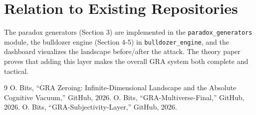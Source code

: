 \documentclass[12pt]{article}
\begin{document}
\section{Relation to Existing Repositories}
The paradox generators (Section 3) are implemented in the \texttt{paradox\_generators} module, the bulldozer engine (Section 4-5) in \texttt{bulldozer\_engine}, and the dashboard visualizes the landscape before/after the attack. The theory paper proves that adding this layer makes the overall GRA system both complete and tactical.

\begin{thebibliography}{9}
 O. Bits, ``GRA Zeroing: Infinite-Dimensional Landscape and the Absolute Cognitive Vacuum,'' GitHub, 2026.
 O. Bits, ``GRA-Multiverse-Final,'' GitHub, 2026.
 O. Bits, ``GRA-Subjectivity-Layer,'' GitHub, 2026.
\end{thebibliography}
\end{document}
